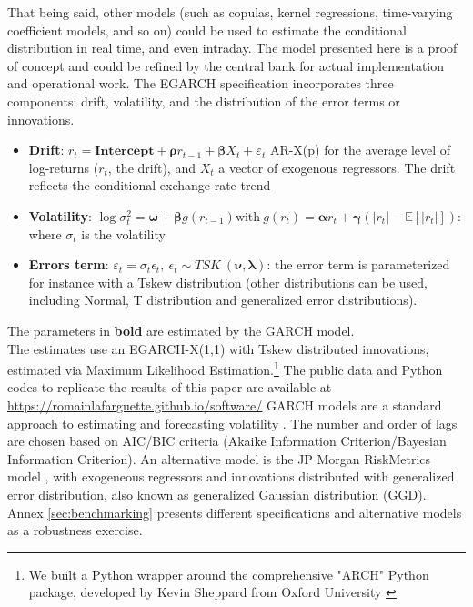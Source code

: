 \documentclass[11pt]{article}
\begin{document}
That  being  said,   other  models  (such  as   copulas,  kernel  regressions,
time-varying coefficient  models, and  so on)  could be  used to  estimate the
conditional distribution in real time, and even intraday.  The model presented
here is a proof of concept and could be refined by the central bank for actual
implementation and  operational work.   The EGARCH  specification incorporates
three components: drift,  volatility, and the distribution of  the error terms
or innovations.\\


\begin{itemize}
\item \textbf{Drift}: $r_t= \bm{Intercept} + \bm{\rho} r_{t-1} + \bm{\beta}
X_t + \varepsilon_t$ AR-X(p) for the average level of log-returns ($r_t$, the
drift), and  $X_t$ a vector of  exogenous regressors.  The drift  reflects the
conditional exchange rate trend

\item \textbf{Volatility}: $\log \sigma_t^2 = \bm{\omega} + \bm{\beta} g(r_{t-1}) \text{with} \
  g(r_t)= \bm{\alpha} r_t + \bm{\gamma}(|r_t| - \mathbb{E}[|r_t|])$: where $\sigma_t$  is
  the volatility 

\item \textbf{Errors term}: $\varepsilon_t = \sigma_t \epsilon_t,\ \epsilon_t \sim TSK\
(\bm{\nu}, \bm{\lambda})$: the error term is parameterized for instance with
a Tskew  distribution (other  distributions can be  used, including  Normal, T
distribution and generalized error distributions).
  
\end{itemize}

The parameters in \textbf{bold} are estimated by the GARCH model.\\

The  estimates  use  an  EGARCH-X(1,1)  with  Tskew  distributed  innovations,
estimated  via  Maximum  Likelihood  Estimation.\footnote{We  built  a  Python
wrapper around  the comprehensive  "ARCH" Python  package, developed  by Kevin
Sheppard  from Oxford  University  \citep{sheppard2020}} The  public data  and
Python  codes  to  replicate  the  results of  this  paper  are  available  at
\url{https://romainlafarguette.github.io/software/}   GARCH   models   are   a
standard approach to estimating  and forecasting volatility \citep{engle2001}.
The number  and order  of lags  are chosen based  on AIC/BIC  criteria (Akaike
Information Criterion/Bayesian Information  Criterion).  An alternative model
is  the  JP  Morgan  RiskMetrics model  \citep{zumbach2007},  with  exogeneous
regressors and  innovations distributed  with generalized  error distribution,
also   known   as   generalized   Gaussian   distribution   (GGD).    Annex
\ref{sec:benchmarking}  presents  different   specifications  and  alternative
models as a robustness exercise.\\
\end{document}
